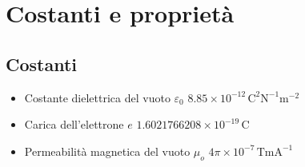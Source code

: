 \documentclass[10pt, oneside]{article}
\begin{document}
\section{Costanti e proprietà}
\subsection{Costanti}
\begin{itemize}
\item Costante dielettrica del vuoto $\varepsilon_0$ \dotfill $\displaystyle 8.85 \times 10^{-12} \, \mathrm{C^2 N^{-1} m^{-2}}$
\item Carica dell'elettrone $e$ \dotfill $\displaystyle 1.6021766208 \times 10^{-19} \, \mathrm{C}$
\item Permeabilità magnetica del vuoto $\mu_o$ \dotfill $\displaystyle 4 \pi \times 10^{-7} \, \mathrm{T m A^{-1}}$





\end{itemize}
\end{document}
